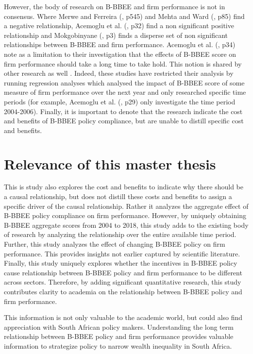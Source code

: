 However, the body of research on B-BBEE and firm performance is not in consensus. Where Merwe and Ferreira (\citeyear{N7}, p545) and Mehta and Ward (\citeyear{N27}, p85) find a negative relationship, Acemoglu et al. (\citeyear{N23}, p32) find a non significant positive relationship and Mokgobinyane (\citeyear{N4}, p3) finds a disperse set of non significant relationships between B-BBEE and firm performance. Acemoglu et al. (\citeyear{N23}, p34) note as a limitation to their investigation that the effects of B-BBEE score on firm performance should take a long time to take hold. This notion is shared by other research as well \cite[p19]{N4}. Indeed, these studies have restricted their analysis by running regression analyses which analysed the impact of B-BBEE score of some measure of firm performance over the next year and only researched specific time periods (for example, Acemoglu et al. (\citeyear{N23}, p29) only investigate the time period  2004-2006). Finally, it is important to denote that the research indicate the cost and benefits of B-BBEE policy compliance, but are unable to distill specific cost and benefits. 
\section{Relevance of this master thesis}
This is study also explores the cost and benefits to indicate why there should be a causal relationship, but does not distill these costs and benefits to assign a specific driver of the causal relationship. Rather it analyzes the aggregate effect of B-BBEE policy compliance on firm performance. However, by uniquely obtaining B-BBEE aggregate scores from 2004 to 2018, this study adds to the existing body of research by analyzing the relationship over the entire available time period. Further, this study analyzes the effect of changing B-BBEE policy on firm performance. This provides insights not earlier captured by scientific literature. Finally, this study uniquely explores whether the incentives in B-BBEE policy cause relationship between B-BBEE policy and firm performance to be different across sectors. Therefore, by adding significant quantitative research, this study contributes clarity to academia on the relationship between B-BBEE policy and firm performance.

This information is not only valuable to the academic world, but could also find appreciation with South African policy makers. Understanding the long term relationship between B-BBEE policy and firm performance provides valuable information to strategize policy to narrow wealth inequality in South Africa.

